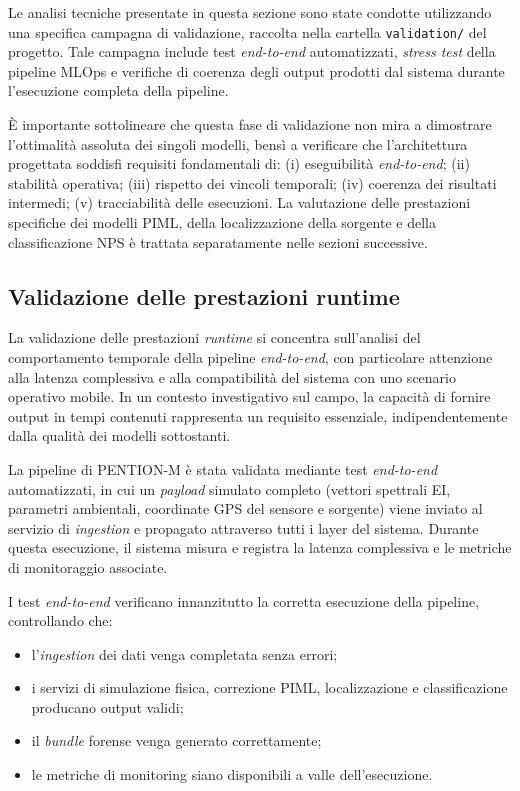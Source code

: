 Le analisi tecniche presentate in questa sezione sono state condotte utilizzando una specifica campagna di validazione, raccolta nella cartella \texttt{validation/} del progetto.
Tale campagna include test \textit{end-to-end} automatizzati, \textit{stress test} della pipeline MLOps e verifiche di coerenza degli output prodotti dal sistema durante l’esecuzione completa della pipeline.

È importante sottolineare che questa fase di validazione non mira a dimostrare l’ottimalità assoluta dei singoli modelli, bensì a verificare che l’architettura progettata soddisfi requisiti fondamentali di:
(i) eseguibilità \textit{end-to-end};
(ii) stabilità operativa;
(iii) rispetto dei vincoli temporali;
(iv) coerenza dei risultati intermedi;
(v) tracciabilità delle esecuzioni.
La valutazione delle prestazioni specifiche dei modelli PIML, della localizzazione della sorgente e della classificazione NPS è trattata separatamente nelle sezioni successive.

\subsection{Validazione delle prestazioni runtime}
\label{subsec:runtime_validation}

La validazione delle prestazioni \textit{runtime} si concentra sull’analisi del comportamento temporale della pipeline \textit{end-to-end}, con particolare attenzione alla latenza complessiva e alla compatibilità del sistema con uno scenario operativo mobile.
In un contesto investigativo sul campo, la capacità di fornire output in tempi contenuti rappresenta un requisito essenziale, indipendentemente dalla qualità dei modelli sottostanti.

La pipeline di \textsc{PENTION-M} è stata validata mediante test \textit{end-to-end} automatizzati, in cui un \textit{payload} simulato completo (vettori spettrali EI, parametri ambientali, coordinate GPS del sensore e sorgente) viene inviato al servizio di \textit{ingestion} e propagato attraverso tutti i layer del sistema.
Durante questa esecuzione, il sistema misura e registra la latenza complessiva e le metriche di monitoraggio associate.

I test \textit{end-to-end} verificano innanzitutto la corretta esecuzione della pipeline, controllando che:
\begin{itemize}
    \item l’\textit{ingestion} dei dati venga completata senza errori;
    \item i servizi di simulazione fisica, correzione PIML, localizzazione e classificazione producano output validi;
    \item il \textit{bundle} forense venga generato correttamente;
    \item le metriche di monitoring siano disponibili a valle dell’esecuzione.
\end{itemize}

